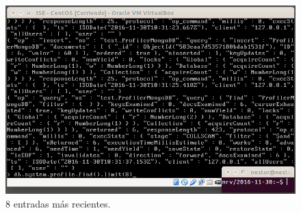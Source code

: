 \documentclass[a4paper,titlepage,12pt]{scrartcl}	%
\numberwithin{figure}{section} %
\numberwithin{table}{section} %
\begin{document}
	\begin{figure}[H]
		\includegraphics[width=\linewidth]{./Imagenes/O11-4.png}
		\vspace{-0.5cm}
		\caption[8 entradas más recientes.]{8 entradas más recientes.}
		\label{O11-4}
	\end{figure}
	
	\clearpage
	
	
\end{document}
